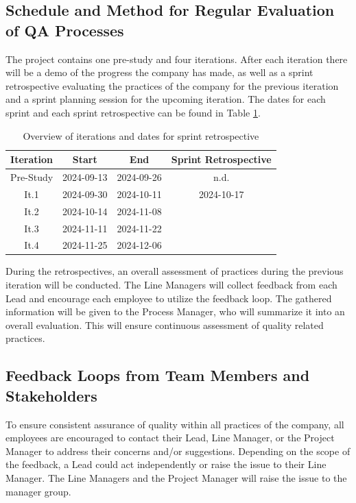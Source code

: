 \documentclass{article}
\begin{document}
\subsection{Schedule and Method for Regular Evaluation of QA Processes}
\label{schedule_and_method_for_regular_evaluation_of_qa_processes}
The project contains one pre-study and four iterations. After each iteration there will be a demo of the progress the company has made, as well as a sprint retrospective evaluating the practices of the company for the previous iteration and a sprint planning session for the upcoming iteration. The dates for each sprint and each sprint retrospective can be found in Table \ref{tab:iteration_table}. 

\begin{table}[H]
    \centering
    \caption{Overview of iterations and dates for sprint retrospective}
    \begin{tabular}{|c|c|c|c|}
    \hline
        \textbf{Iteration} & \textbf{Start} & \textbf{End} & \textbf{Sprint Retrospective}\\\hline
        Pre-Study & 2024-09-13 & 2024-09-26 & n.d. \\\hline
        It.1 & 2024-09-30 & 2024-10-11 & 2024-10-17 \\\hline
        It.2 & 2024-10-14 & 2024-11-08 & \\\hline
        It.3 & 2024-11-11 & 2024-11-22 & \\\hline
        It.4 & 2024-11-25 & 2024-12-06 & \\\hline
    \end{tabular}
    \label{tab:iteration_table}
\end{table}

During the retrospectives, an overall assessment of practices during the previous iteration will be conducted. The Line Managers will collect feedback from each Lead and encourage each employee to utilize the feedback loop. The gathered information will be given to the Process Manager, who will summarize it into an overall evaluation. This will ensure continuous assessment of quality related practices.


\subsection{Feedback Loops from Team Members and Stakeholders}
To ensure consistent assurance of quality within all practices of the company, all employees are encouraged to contact their Lead, Line Manager, or the Project Manager to address their concerns and/or suggestions. Depending on the scope of the feedback, a Lead could act independently or raise the issue to their Line Manager. The Line Managers and the Project Manager will raise the issue to the manager group.
\end{document}
